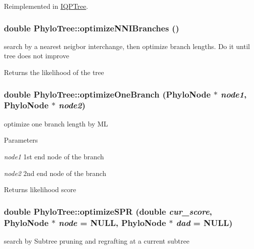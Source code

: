 Reimplemented in \hyperlink{classIQPTree_a8d1a63f976a3a219bc8a23ed356e1d65}{IQPTree}.\hypertarget{classPhyloTree_acef313906a2021de5de2eb87226a202d}{
\subsubsection[{optimizeNNIBranches}]{\setlength{\rightskip}{0pt plus 5cm}double PhyloTree::optimizeNNIBranches ()}}
\label{classPhyloTree_acef313906a2021de5de2eb87226a202d}
search by a nearest neigbor interchange, then optimize branch lengths. Do it until tree does not improve \begin{DoxyReturn}{Returns}
the likelihood of the tree 
\end{DoxyReturn}
\hypertarget{classPhyloTree_a93e28f41404baeca2afcb62f4499a3e1}{
\subsubsection[{optimizeOneBranch}]{\setlength{\rightskip}{0pt plus 5cm}double PhyloTree::optimizeOneBranch ({\bf PhyloNode} $\ast$ {\em node1}, \/  {\bf PhyloNode} $\ast$ {\em node2})}}
\label{classPhyloTree_a93e28f41404baeca2afcb62f4499a3e1}
optimize one branch length by ML 
\begin{DoxyParams}{Parameters}
\item[{\em node1}]1st end node of the branch \item[{\em node2}]2nd end node of the branch \end{DoxyParams}
\begin{DoxyReturn}{Returns}
likelihood score 
\end{DoxyReturn}
\hypertarget{classPhyloTree_a726b99499f5a40395fc3c825d2d0a9ad}{
\subsubsection[{optimizeSPR}]{\setlength{\rightskip}{0pt plus 5cm}double PhyloTree::optimizeSPR (double {\em cur\_\-score}, \/  {\bf PhyloNode} $\ast$ {\em node} = {\ttfamily NULL}, \/  {\bf PhyloNode} $\ast$ {\em dad} = {\ttfamily NULL})}}
\label{classPhyloTree_a726b99499f5a40395fc3c825d2d0a9ad}
search by Subtree pruning and regrafting at a current subtree 
